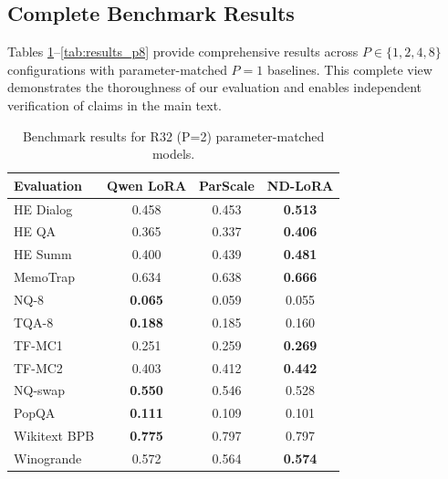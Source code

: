 \documentclass{article} %
\begin{document}
\subsection{Complete Benchmark Results}
\label{sec:complete_results}

Tables \ref{tab:results_p2}--\ref{tab:results_p8} provide comprehensive results across $P \in \lbrace 1, 2,
4, 8 \rbrace$ configurations with parameter-matched $P=1$ baselines. This complete view demonstrates the
thoroughness of our evaluation and enables independent verification of claims in the main text.

\begin{table}[htbp]
  \centering
  \begin{tabular}{l|ccc}
    \textbf{Evaluation} & \textbf{Qwen LoRA} & \textbf{ParScale} & \textbf{ND-LoRA} \\
    \hline
    HE Dialog & 0.458 & 0.453 & \textbf{0.513} \\
    HE QA & 0.365 & 0.337 & \textbf{0.406} \\
    HE Summ & 0.400 & 0.439 & \textbf{0.481} \\
    MemoTrap & 0.634 & 0.638 & \textbf{0.666} \\
    NQ-8 & \textbf{0.065} & 0.059 & 0.055 \\
    TQA-8 & \textbf{0.188} & 0.185 & 0.160 \\
    TF-MC1 & 0.251 & 0.259 & \textbf{0.269} \\
    TF-MC2 & 0.403 & 0.412 & \textbf{0.442} \\
    NQ-swap & \textbf{0.550} & 0.546 & 0.528 \\
    PopQA & \textbf{0.111} & 0.109 & 0.101 \\
    Wikitext BPB & \textbf{0.775} & 0.797 & 0.797 \\
    Winogrande & 0.572 & 0.564 & \textbf{0.574} \\
  \end{tabular}
  \caption{
    Benchmark results for R32 (P=2) parameter-matched models.
  }
  \label{tab:results_p2}
\end{table}
\end{document}
